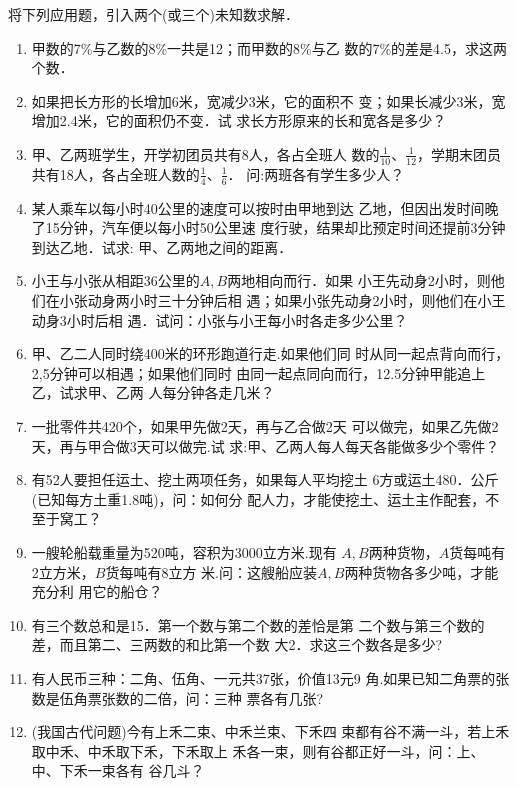 将下列应用题，引入两个(或三个)未知数求解．

\begin{enumerate}
    \item  甲数的7\%与乙数的8\%一共是12；而甲数的8\%与乙
    数的7\%的差是4.5，求这两个数．
    \item 如果把长方形的长增加6米，宽减少3米，它的面积不
    变；如果长减少3米，宽增加2.4米，它的面积仍不变．试
    求长方形原来的长和宽各是多少？
    \item 甲、乙两班学生，开学初团员共有8人，各占全班人
    数的$\frac{1}{10}$、$\frac{1}{12}$，学期末团员共有18人，各占全班人数的$\frac{1}{4}$、$\frac{1}{6}$．
    问:两班各有学生多少人？
    \item 某人乘车以每小时40公里的速度可以按时由甲地到达
    乙地，但因出发时间晚了15分钟，汽车便以每小时50公里速
    度行驶，结果却比预定时间还提前3分钟到达乙地．试求:
    甲、乙两地之间的距离．
    \item 小王与小张从相距36公里的$A, B$两地相向而行．如果
    小王先动身2小时，则他们在小张动身两小时三十分钟后相
    遇；如果小张先动身2小时，则他们在小王动身3小时后相
    遇．试问：小张与小王每小时各走多少公里？
    \item 甲、乙二人同时绕400米的环形跑道行走.如果他们同
    时从同一起点背向而行，2,5分钟可以相遇；如果他们同时
    由同一起点同向而行，12.5分钟甲能追上乙，试求甲、乙两
    人每分钟各走几米？
    \item 一批零件共420个，如果甲先做2天，再与乙合做2天
    可以做完，如果乙先做2天，再与甲合做3天可以做完.试
    求:甲、乙两人每人每天各能做多少个零件？
    \item 有52人要担任运土、挖土两项任务，如果每人平均挖土
    6方或运土480．公斤(已知每方土重1.8吨)，问：如何分
    配人力，才能使挖土、运土主作配套，不至于窝工？
    \item 一艘轮船载重量为520吨，容积为3000立方米.现有
    $A, B$两种货物，$A$货每吨有2立方米，$B$货每吨有8立方
    米.问：这艘船应装$A, B$两种货物各多少吨，才能充分利
    用它的船仓？
    \item 有三个数总和是15．第一个数与第二个数的差恰是第
    二个数与第三个数的差，而且第二、三两数的和比第一个数
    大2．求这三个数各是多少?
    \item 有人民币三种：二角、伍角、一元共37张，价值13元9
    角.如果已知二角票的张数是伍角票张数的二倍，问：三种
    票各有几张?
    \item (我国古代问题)今有上禾二束、中禾兰束、下禾四
    束都有谷不满一斗，若上禾取中禾、中禾取下禾，下禾取上
    禾各一束，则有谷都正好一斗，问：上、中、下禾一束各有
    谷几斗？
    
\end{enumerate}

